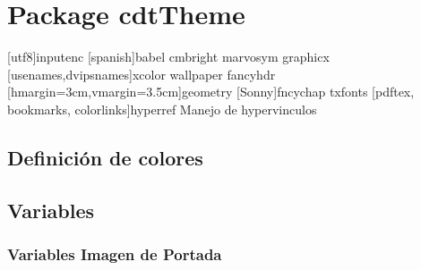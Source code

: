 \chapter{Package cdtTheme}
\label{ch:theme}

[utf8]{inputenc}                      %
[spanish]{babel}                      %
{cmbright}                            %
{marvosym}                            %
{graphicx}                            %
[usenames,dvipsnames]{xcolor}         %
{wallpaper}                           %
{fancyhdr}                            %
[hmargin=3cm,vmargin=3.5cm]{geometry} %
[Sonny]{fncychap}                     %
{txfonts}                             %
[pdftex, bookmarks, colorlinks]{hyperref} Manejo de hypervinculos

\section{Definición de colores}

    \begin{code}

\hypersetup{linkcolor=colorPrincipal}
\hypersetup{urlcolor=colorSecundario}
\hypersetup{filecolor=colorSecundario}
\hypersetup{citecolor=colorGris}
    \end{code}

\section{Variables}

    \hypertarget{varImgPortadaPercent}{}
    \hypertarget{varImgPortada}{}
    \subsection{Variables Imagen de Portada}
    
    
    \hypertarget{varImgPleca}{}
    \hypertarget{varImgPlecaPercent}{}
